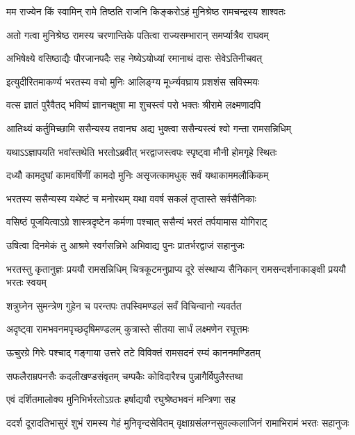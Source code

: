 \twolineshloka
{मम राज्येन किं स्वामिन् रामे तिष्ठति राजनि}
{किङ्करोऽहं मुनिश्रेष्ठ रामचन्द्रस्य शाश्वतः} %

\twolineshloka
{अतो गत्वा मुनिश्रेष्ठ रामस्य चरणान्तिके}
{पतित्वा राज्यसम्भारान् समर्प्यात्रैव राघवम्} %

\twolineshloka
{अभिषेक्ष्ये वसिष्ठाद्यैः पौरजानपदैः सह}
{नेष्येऽयोध्यां रमानाथं दासः सेवेऽतिनीचवत्} %

\twolineshloka
{इत्युदीरितमाकर्ण्य भरतस्य वचो मुनिः}
{आलिङ्ग्य मूर्ध्न्यवघ्राय प्रशशंस सविस्मयः} %

\twolineshloka
{वत्स ज्ञातं पुरैवैतद् भविष्यं ज्ञानचक्षुषा}
{मा शुचस्त्वं परो भक्तः श्रीरामे लक्ष्मणादपि} %

\twolineshloka
{आतिथ्यं कर्तुमिच्छामि ससैन्यस्य तवानघ}
{अद्य भुक्त्वा ससैन्यस्त्वं श्वो गन्ता रामसन्निधिम्} %

\twolineshloka
{यथाऽऽज्ञापयति भवांस्तथेति भरतोऽब्रवीत्}
{भरद्वाजस्त्वपः स्पृष्ट्वा मौनी होमगृहे स्थितः} %

\twolineshloka
{दध्यौ कामदुघां कामवर्षिणीं कामदो मुनिः}
{असृजत्कामधुक् सर्वं यथाकाममलौकिकम्} %

\twolineshloka
{भरतस्य ससैन्यस्य यथेष्टं च मनोरथम्}
{यथा ववर्ष सकलं तृप्तास्ते सर्वसैनिकाः} %

\twolineshloka
{वसिष्ठं पूजयित्वाऽग्रे शास्त्रदृष्टेन कर्मणा}
{पश्चात् ससैन्यं भरतं तर्पयामास योगिराट्} %

\twolineshloka
{उषित्वा दिनमेकं तु आश्रमे स्वर्गसन्निभे}
{अभिवाद्य पुनः प्रातर्भरद्वाजं सहानुजः} %

\threelineshloka
{भरतस्तु कृतानुज्ञः प्रययौ रामसन्निधिम्}
{चित्रकूटमनुप्राप्य दूरे संस्थाप्य सैनिकान्}
{रामसन्दर्शनाकाङ्क्षी प्रययौ भरतः स्वयम्} %

\twolineshloka
{शत्रुघ्नेन सुमन्त्रेण गुहेन च परन्तपः}
{तपस्विमण्डलं सर्वं विचिन्वानो न्यवर्तत} %

\twolineshloka
{अदृष्ट्वा रामभवनमपृच्छदृषिमण्डलम्}
{कुत्रास्ते सीतया सार्धं लक्ष्मणेन रघूत्तमः} %

\twolineshloka
{ऊचुरग्रे गिरेः पश्चाद् गङ्गाया उत्तरे तटे}
{विविक्तं रामसदनं रम्यं काननमण्डितम्} %

\twolineshloka
{सफलैराम्रपनसैः कदलीखण्डसंवृतम्}
{चम्पकैः कोविदारैश्च पुन्नागैर्विपुलैस्तथा} %

\twolineshloka
{एवं दर्शितमालोक्य मुनिभिर्भरतोऽग्रतः}
{हर्षाद्ययौ रघुश्रेष्ठभवनं मन्त्रिणा सह} %

\fourlineindentedshloka
{ददर्श दूरादतिभासुरं शुभं}
{रामस्य गेहं मुनिवृन्दसेवितम्}
{वृक्षाग्रसंलग्नसुवल्कलाजिनं}
{रामाभिरामं भरतः सहानुजः} %

